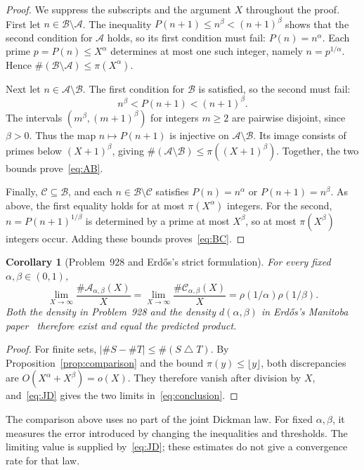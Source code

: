 \documentclass[11pt,a4paper]{amsart}
\newtheorem{corollary}[proposition]{Corollary}
\newcommand{\A}{\mathcal A}
\newcommand{\B}{\mathcal B}
\newcommand{\C}{\mathcal C}
\begin{document}
\begin{proof}
We suppress the subscripts and the argument $X$ throughout the proof.
First let $n\in\B\setminus\A$. The inequality
$P(n+1)\le n^\beta<(n+1)^\beta$ shows that the second condition
for $\A$ holds, so its first condition must fail: $P(n)=n^\alpha$.
Each prime $p=P(n)\le X^\alpha$ determines at most one such integer,
namely $n=p^{1/\alpha}$. Hence
$\#(\B\setminus\A)\le\pi(X^\alpha)$.

Next let $n\in\A\setminus\B$. The first condition for $\B$ is
satisfied, so the second must fail:
\[
 n^\beta<P(n+1)<(n+1)^\beta.
\]
The intervals $(m^\beta,(m+1)^\beta)$ for integers $m\ge2$ are
pairwise disjoint, since $\beta>0$. Thus the map $n\mapsto P(n+1)$
is injective on $\A\setminus\B$. Its image consists of primes below
$(X+1)^\beta$, giving $\#(\A\setminus\B)\le\pi((X+1)^\beta)$.
Together, the two bounds prove~\eqref{eq:AB}.

Finally, $\C\subseteq\B$, and each $n\in\B\setminus\C$ satisfies
$P(n)=n^\alpha$ or $P(n+1)=n^\beta$. As above, the first equality
holds for at most $\pi(X^\alpha)$ integers. For the second,
$n=P(n+1)^{1/\beta}$ is determined by a prime at most $X^\beta$,
so at most $\pi(X^\beta)$ integers occur. Adding these bounds
proves~\eqref{eq:BC}.
\end{proof}

\begin{corollary}[Problem~928 and Erd\H{o}s's strict formulation]\label{cor:density}
For every fixed $\alpha,\beta\in(0,1)$,
\begin{equation}\label{eq:conclusion}
 \lim_{X\to\infty}\frac{\#\A_{\alpha,\beta}(X)}X
 =\lim_{X\to\infty}\frac{\#\C_{\alpha,\beta}(X)}X
 =\rho(1/\alpha)\rho(1/\beta).
\end{equation}
Both the density in Problem~928 and the density $d(\alpha,\beta)$
in Erd\H{o}s's Manitoba paper~\cite[p.~25]{Erdos1976Manitoba} therefore
exist and equal the predicted product.
\end{corollary}

\begin{proof}
For finite sets, $|\#S-\#T|\le\#(S\mathbin\triangle T)$.
By Proposition~\ref{prop:comparison} and the bound
$\pi(y)\le\lfloor y\rfloor$, both discrepancies are
$O(X^\alpha+X^\beta)=o(X)$. They therefore vanish after division by
$X$, and~\eqref{eq:JD} gives the two limits in~\eqref{eq:conclusion}.
\end{proof}

The comparison above uses no part of the joint Dickman law.
For fixed $\alpha,\beta$, it measures the error introduced by changing
the inequalities and thresholds. The limiting value is supplied
by~\eqref{eq:JD}; these estimates do not give a convergence rate for
that law.
\end{document}
